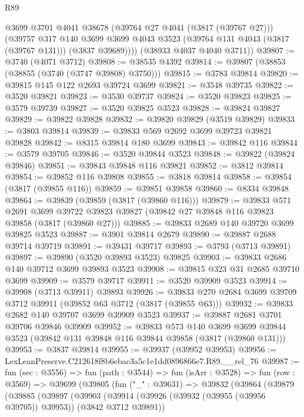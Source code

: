 \begin{lexlean}{R89}
\begin{coremodule}
          @3699
          @3701
          @4041
          @38678
          (@39764 @27 @4041 (@3817 (@39767 @27)))
          (@39757
            @317
            @140
            @3699
            @3699
            @4043
            @3523
            (@39764 @131 @4043 (@3817 (@39767 @131)))
            (@3837 @39689))))
      (@38933 @4037 @4040 @3711))
@39807 := @3740 (@4071 @3712)
@39808 := @38535 @4392
@39814 := @39807 (@38853 (@38855 (@3740 (@3747 @39808) @3750)))
@39815 := @3783 @39814
@39820 := @39815 @145 @122 @2693 @39724 @3699
@39821 := @3548 @39735
@39822 := @3520 @39821
@39823 := @3530 @39737
@39824 := @3520 @39823
@39825 := @3579 @39739
@39827 := @3520 @39825 @3523
@39828 := @39824 @39827
@39829 := @39822 @39828
@39832 := @39820 @39829 (@3519 @39829)
@39833 := @3803 @39814
@39839 := @39833 @569 @2692 @3699 @39723 @39821 @39828
@39842 := @8315 @39814 @180 @3699
@39843 := @39842 @116
@39844 := @3579 @39705
@39846 := @3520 @39844 @3523
@39848 := @39822 (@39824 @39846)
@39851 := @39843 @39848 @116 @39821
@39852 := @3812 @39814
@39854 := @39852 @116 @39808
@39855 := @3818 @39814
@39858 := @39854 (@3817 (@39855 @116))
@39859 := @39851 @39858
@39860 := @8334 @39848
@39864 := @39839 (@39859 (@3817 (@39860 @116)))
@39879 := @39833
    @571
    @2691
    @3699
    @39722
    @39823
    @39827
    (@39842 @27 @39848 @116 @39823 @39858 (@3817 (@39860 @27)))
@39885 := @39833 @2689 @140 @39720 @3699 @39825 @3523
@39887 := @3901 @39814 @2679
@39890 := @39887 @2688 @39714 @39719
@39891 := @39431 @39717
@39893 := @3793 (@3713 @39891)
@39897 := @39890 (@3520 @39893 @3523) @39825
@39903 := @39833 @2686 @140 @39712 @3699 @39893 @3523
@39908 := @39815 @323 @31 @2685 @39710 @3699
@39909 := @3579 @39717
@39911 := @3520 @39909 @3523
@39914 := @39908 (@3713 @39911) @39893
@39926 := @39833 @270 @2684 @3699 @39709 @3712 @39911 (@39852 @63 @3712 (@3817 (@39855 @63)))
@39932 := @39833 @2682 @140 @39707 @3699 @39909 @3523
@39937 := @39887 @2681 @3701 @39706 @39846 @39909
@39952 := @39833
    @573
    @140
    @3699
    @3699
    @39844
    @3523
    (@39842 @131 @39848 @116 @39844 @39858 (@3817 (@39860 @131)))
@39953 := @3837 @39814
@39955 := @39937 (@39952 @39953)
@39956 := LexLeanPreserve.C212618f8b6ebac3a5c1e1dd0896866e7.R89.__rel_76
@39987 := fun (sec : @3556) =>
  fun (path : @3544) =>
  fun (isArr : @3528) =>
  fun (row : @3569) =>
  @39699
    (@39805
      (fun ("_" : @39631) =>
      @39832
        (@39864
          (@39879
            (@39885
              (@39897
                (@39903
                  (@39914 (@39926 (@39932 (@39955 (@39956 @39705)) @39953)) (@3842 @3712 @39891))

\end{coremodule}
\end{lexlean}
